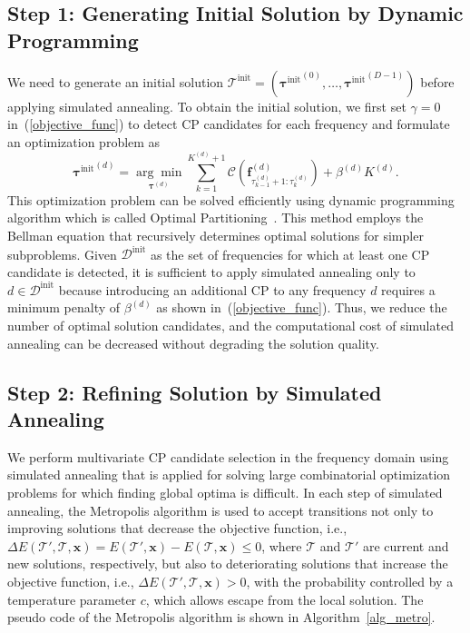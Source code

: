 \subsection{Step 1: Generating Initial Solution by Dynamic Programming}
\label{subsec:DP}
We need to generate an initial solution ${\bm{\mathcal{T}}}^{\text{init}} = ({\bm{\tau}^{\text{init}}}^{(0)}, \dots, {\bm{\tau}^{\text{init}}}^{(D-1)})$ before applying simulated annealing.
To obtain the initial solution, we first set $\gamma = 0$ in~(\ref{objective_func}) to detect CP candidates for each frequency and formulate an optimization problem as
\begin{equation}
  {\bm{\tau}^{\text{init}}}^{(d)} = \underset{\bm{\tau}^{(d)}}{\arg\min\limits} \sum_{k=1}^{{K}^{(d)}+1} \mathcal{C} \left(\bm{f}_{\tau_{k - 1}^{(d)}+1 : \tau_k^{(d)}}^{(d)}\right) + \beta^{(d)} {K}^{(d)}. \label{PO}
\end{equation} 
This optimization problem can be solved efficiently using dynamic programming algorithm which is called Optimal Partitioning~\citep{jackson2005algorithm}.
This method employs the Bellman equation that recursively determines optimal solutions for simpler subproblems.
Given $\mathcal{D}^{\text{init}}$ as the set of frequencies for which at least one CP candidate is detected, 
it is sufficient to apply simulated annealing only to $d \in \mathcal{D}^{\text{init}}$ 
because introducing an additional CP to any frequency $d$ requires a minimum penalty of $\beta^{(d)}$ as shown in~(\ref{objective_func}). 
Thus, we reduce the number of optimal solution candidates, 
and the computational cost of simulated annealing can be decreased without degrading the solution quality.

\subsection{Step 2: Refining Solution by Simulated Annealing}
\label{subsec:SA}
We perform multivariate CP candidate selection in the frequency domain using simulated annealing that is applied for solving large combinatorial optimization problems for which finding global optima is difficult.
In each step of simulated annealing, the Metropolis algorithm is used to accept transitions not only to improving solutions that decrease the objective function, 
i.e., $\Delta E (\mathcal{T}', \mathcal{T}, \bm{x}) = E(\mathcal{T}', \bm{x}) - E(\mathcal{T}, \bm{x}) \leq 0$, 
where $\mathcal{T}$ and $\mathcal{T}'$ are current and new solutions, respectively,
but also to deteriorating solutions that increase the objective function, 
i.e., $\Delta E (\mathcal{T}', \mathcal{T}, \bm{x}) > 0$, 
with the probability controlled by a temperature parameter $c$, %
which allows escape from the local solution. 
The pseudo code of the Metropolis algorithm is shown in Algorithm~{\ref{alg_metro}}.

